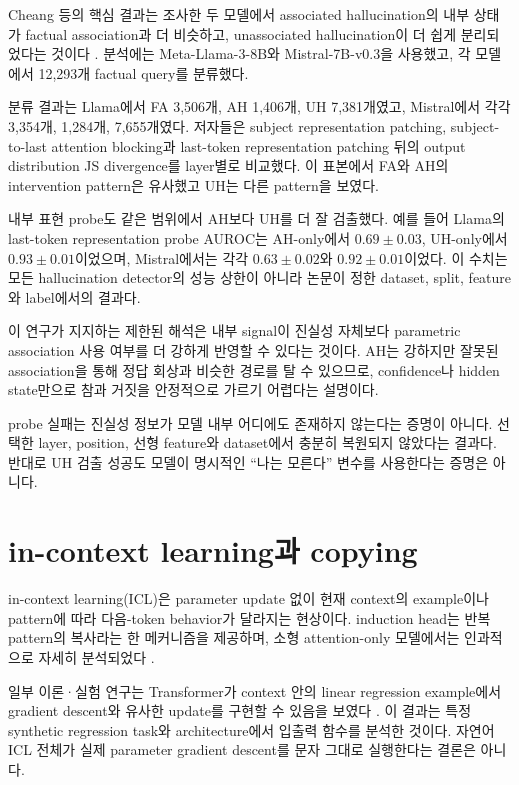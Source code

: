 Cheang 등의 핵심 결과는 조사한 두 모델에서 associated hallucination의 내부 상태가 factual association과 더 비슷하고, unassociated hallucination이 더 쉽게 분리되었다는 것이다 \citep{cheang2026knowledge}.
분석에는 Meta-Llama-3-8B와 Mistral-7B-v0.3을 사용했고, 각 모델에서 12,293개 factual query를 분류했다.

분류 결과는 Llama에서 FA 3,506개, AH 1,406개, UH 7,381개였고, Mistral에서 각각 3,354개, 1,284개, 7,655개였다.
저자들은 subject representation patching, subject-to-last attention blocking과 last-token representation patching 뒤의 output distribution JS divergence를 layer별로 비교했다.
이 표본에서 FA와 AH의 intervention pattern은 유사했고 UH는 다른 pattern을 보였다.

내부 표현 probe도 같은 범위에서 AH보다 UH를 더 잘 검출했다.
예를 들어 Llama의 last-token representation probe AUROC는 AH-only에서 $0.69\pm0.03$, UH-only에서 $0.93\pm0.01$이었으며, Mistral에서는 각각 $0.63\pm0.02$와 $0.92\pm0.01$이었다.
이 수치는 모든 hallucination detector의 성능 상한이 아니라 논문이 정한 dataset, split, feature와 label에서의 결과다.

이 연구가 지지하는 제한된 해석은 내부 signal이 진실성 자체보다 parametric association 사용 여부를 더 강하게 반영할 수 있다는 것이다.
AH는 강하지만 잘못된 association을 통해 정답 회상과 비슷한 경로를 탈 수 있으므로, confidence나 hidden state만으로 참과 거짓을 안정적으로 가르기 어렵다는 설명이다.

\begin{limitbox}
probe 실패는 진실성 정보가 모델 내부 어디에도 존재하지 않는다는 증명이 아니다.
선택한 layer, position, 선형 feature와 dataset에서 충분히 복원되지 않았다는 결과다.
반대로 UH 검출 성공도 모델이 명시적인 ``나는 모른다'' 변수를 사용한다는 증명은 아니다.
\end{limitbox}

\section{in-context learning과 copying}

in-context learning(ICL)은 parameter update 없이 현재 context의 example이나 pattern에 따라 다음-token behavior가 달라지는 현상이다.
induction head는 반복 pattern의 복사라는 한 메커니즘을 제공하며, 소형 attention-only 모델에서는 인과적으로 자세히 분석되었다 \citep{olsson2022induction}.

일부 이론·실험 연구는 Transformer가 context 안의 linear regression example에서 gradient descent와 유사한 update를 구현할 수 있음을 보였다 \citep{vonoswald2023icl,akyurek2023icl}.
이 결과는 특정 synthetic regression task와 architecture에서 입출력 함수를 분석한 것이다.
자연어 ICL 전체가 실제 parameter gradient descent를 문자 그대로 실행한다는 결론은 아니다.

